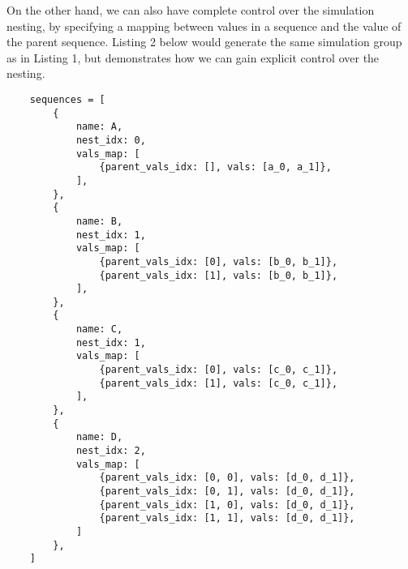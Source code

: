 \documentclass[12pt]{article}
\begin{document}
On the other hand, we can also have complete control over the simulation nesting, by specifying a mapping between values in a sequence and the value of the parent sequence. Listing 2 below would generate the same simulation group as in Listing 1, but demonstrates how we can gain explicit control over the nesting.

\lstset{
    caption=Finer control over simulation sequences.}

\begin{lstlisting}
    sequences = [
        {
            name: A,
            nest_idx: 0,
            vals_map: [
                {parent_vals_idx: [], vals: [a_0, a_1]},
            ],
        },
        {
            name: B,
            nest_idx: 1,
            vals_map: [
                {parent_vals_idx: [0], vals: [b_0, b_1]},
                {parent_vals_idx: [1], vals: [b_0, b_1]},
            ],
        },
        {
            name: C,
            nest_idx: 1,
            vals_map: [
                {parent_vals_idx: [0], vals: [c_0, c_1]},
                {parent_vals_idx: [1], vals: [c_0, c_1]},
            ],
        },    
        {
            name: D,
            nest_idx: 2,
            vals_map: [
                {parent_vals_idx: [0, 0], vals: [d_0, d_1]},
                {parent_vals_idx: [0, 1], vals: [d_0, d_1]},
                {parent_vals_idx: [1, 0], vals: [d_0, d_1]},
                {parent_vals_idx: [1, 1], vals: [d_0, d_1]},
            ]
        },    
    ]
    \end{lstlisting}
\end{document}
